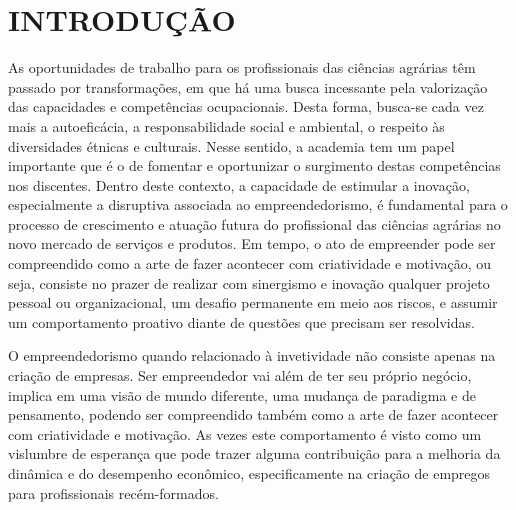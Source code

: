 \chapter{INTRODUÇÃO}

As oportunidades de trabalho para os profissionais das ciências agrárias têm passado por transformações, em que há uma busca incessante pela valorização das capacidades e competências ocupacionais. Desta forma, busca-se cada vez mais a autoeficácia, a responsabilidade social e ambiental, o respeito às diversidades étnicas e culturais. Nesse sentido, a academia tem um papel importante que é o de fomentar e oportunizar o surgimento destas competências nos discentes. Dentro deste contexto, a capacidade de estimular a inovação, especialmente a disruptiva associada ao empreendedorismo, é fundamental para o processo de crescimento e atuação futura do profissional das ciências agrárias no novo mercado de serviços e produtos. Em tempo, o ato de empreender pode ser compreendido como a arte de fazer acontecer com criatividade e motivação, ou seja, consiste no prazer de realizar com sinergismo e inovação qualquer projeto pessoal ou organizacional, um desafio permanente em meio aos riscos, e assumir um comportamento proativo diante de questões que precisam ser resolvidas.

O empreendedorismo quando relacionado à invetividade não consiste apenas na criação de empresas. Ser empreendedor vai além de ter seu próprio negócio, implica em uma visão de mundo diferente, uma mudança de paradigma e de pensamento, podendo ser compreendido também como a arte de fazer acontecer com criatividade e motivação. As vezes este comportamento é visto como um vislumbre de esperança que pode trazer alguma contribuição para a melhoria da dinâmica e do desempenho econômico, especificamente na criação de empregos para profissionais recém-formados. 

